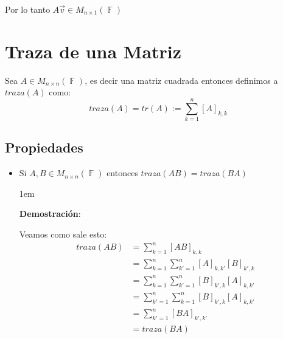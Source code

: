 \documentclass[12pt, fleqn]{report}                             %
\newenvironment{SmallIndentation}[1][0.75em]                    %
        {\begin{adjustwidth}{#1}{}\begin{footnotesize}}             %
        {\end{footnotesize}\end{adjustwidth}}                       %
\theoremstyle{break}                                            %
\DeclareMathOperator \GenericField {\mathbb{F}}                 %
\begin{document}
                Por lo tanto $A\vec{v} \in M_{n \times 1}(\GenericField)$



        \clearpage
        \section{Traza de una Matriz}

            Sea $A \in M_{n \times n}(\GenericField)$, es decir una matriz cuadrada entonces
            definimos a $traza(A)$ como:
            \begin{equation*}
                traza(A) 
                    = tr(A)
                    := \sum_{k = 1}^n [A]_{k, k}
            \end{equation*}


            \subsection{Propiedades}

                \begin{itemize}
                    
                    \item
                        Si $A, B \in M_{n \times n}(\GenericField)$ entonces $traza(AB) = traza(BA)$
                        \begin{SmallIndentation}[1em]
                            \textbf{Demostración}:
                            
                            Veamos como sale esto:
                            \begin{align*}
                                traza(AB)
                                    &= \sum_{k = 1}^n [AB]_{k, k}                                \\
                                    &= \sum_{k = 1}^n \sum_{k' = 1}^n [A]_{k, k'} [B]_{k', k}    \\
                                    &= \sum_{k = 1}^n \sum_{k' = 1}^n [B]_{k', k} [A]_{k, k'}    \\
                                    &= \sum_{k' = 1}^n \sum_{k = 1}^n [B]_{k', k} [A]_{k, k'}    \\
                                    &= \sum_{k' = 1}^n [BA]_{k', k'}                             \\
                                    &= traza(BA)
                            \end{align*}
                        
                        \end{SmallIndentation}
                            

                \end{itemize}
\end{document}
